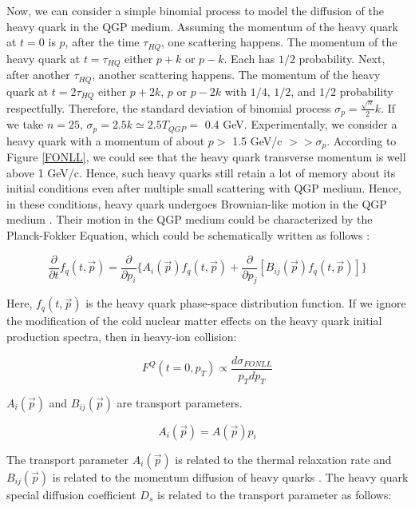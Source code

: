 Now, we can consider a simple binomial process to model the diffusion of the heavy quark in the QGP medium. Assuming the momentum of the heavy quark at $t = 0$ is $p$, after the time $\tau_{HQ}$, one scattering happens. The momentum of the heavy quark at $t = \tau_{HQ}$ either $p + k$ or $p - k$. Each has $1/2$ probability. Next, after another $\tau_{HQ}$, another scattering happens. The momentum of the heavy quark at $t = 2\tau_{HQ}$ either $p + 2k$, $p$ or $p - 2k$ with $1/4$, $1/2$, and $1/2$ probability respectfully. Therefore, the standard deviation of binomial process $\sigma_p = \frac{\sqrt{n}}{2} k$. If we take $n = 25$, $\sigma_p = 2.5k \simeq 2.5 T_{QGP} =$ 0.4 GeV. Experimentally, we consider a heavy quark with a momentum of about $p  > $ 1.5 GeV/c $>> \sigma_p$. According to Figure \ref{FONLL}, we could see that the heavy quark transverse momentum is well above 1 GeV/c. Hence, such heavy quarks still retain a lot of memory about its initial conditions even after multiple small scattering with QGP medium. Hence, in these conditions, heavy quark undergoes Brownian-like motion in the QGP medium \cite{HQReview}. Their motion in the QGP medium could be characterized by the Planck-Fokker Equation, which could be schematically written as follows \cite{HQRaff}:

\begin{equation}
\frac{\partial}{\partial t} f_q(t, \vec{p}) = \frac{\partial}{\partial p_{i}} \{ A_i(\vec p) f_q(t,\vec{p}) + \frac{\partial}{\partial p_j}[B_{ij}(\vec{p})f_q(t,\vec{p}) ] \}
\end{equation}

Here, $f_q(t,\vec{p})$ is the heavy quark phase-space distribution function. If we ignore the modification of the cold nuclear matter effects on the heavy quark initial production spectra, then in heavy-ion collision:

\begin{equation}
F^Q( t = 0,p_T) \propto \frac{d\sigma_{FONLL}}{p_Tdp_T}
\end{equation}

$A_i(\vec p)$ and $B_{ij}(\vec p)$ are transport parameters. 

\begin{equation}
A_i(\vec p) = A(\vec p) p_i
\end{equation}


The transport parameter $A_i(\vec{p})$ is related to the thermal relaxation rate and $B_{ij}(\vec{p})$ is related to the momentum diffusion of heavy quarks \cite{HQReview}. The heavy quark special diffusion coefficient $D_s$ is related to the transport parameter as follows:

